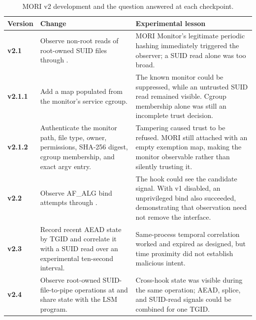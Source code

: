 \begin{table}[H]
    \centering
    \caption{MORI v2 development and the question answered at each checkpoint.}
    \label{tab:mori-development-progression}
    \scriptsize
    \begin{tabularx}{\textwidth}{@{}>{\bfseries}p{}>{\raggedright\arraybackslash}p{}Y@{}}
        \toprule
        Version & Change & Experimental lesson \\
        \midrule
        v2.1 & Observe non-root reads of root-owned SUID files through
        . &
        MORI Monitor's legitimate periodic hashing immediately triggered the
        observer; a SUID read alone was too broad. \\

        v2.1.1 & Add a  map populated from the monitor's
        service cgroup. &
        The known monitor could be suppressed, while an untrusted SUID read
        remained visible. Cgroup membership alone was still an incomplete
        trust decision. \\

        v2.1.2 & Authenticate the monitor path, file type, owner, permissions,
        SHA-256 digest, cgroup membership, and exact argv entry. &
        Tampering caused trust to be refused. MORI still attached with an empty
        exemption map, making the monitor observable rather than silently
        trusting it. \\

        v2.2 & Observe AF\_ALG  bind attempts through
        . &
        The hook could see the candidate signal. With v1 disabled, an
        unprivileged  bind also succeeded, demonstrating that
        observation need not remove the interface. \\

        v2.3 & Record recent AEAD state by TGID and correlate it with a SUID
        read over an experimental ten-second interval. &
        Same-process temporal correlation worked and expired as designed, but
        time proximity did not establish malicious intent. \\

        v2.4 & Observe root-owned SUID-file-to-pipe operations at
         and share state with the LSM program. &
        Cross-hook state was visible during the same operation; AEAD, splice,
        and SUID-read signals could be combined for one TGID. \\


\end{tabularx}
\end{table}
